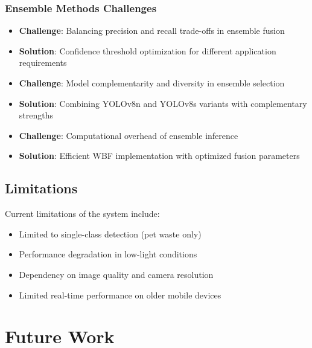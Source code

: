 \documentclass[12pt,a4paper]{article}
\begin{document}
\subsubsection{Ensemble Methods Challenges}
\begin{itemize}
    \item \textbf{Challenge}: Balancing precision and recall trade-offs in ensemble fusion
    \item \textbf{Solution}: Confidence threshold optimization for different application requirements
    \item \textbf{Challenge}: Model complementarity and diversity in ensemble selection
    \item \textbf{Solution}: Combining YOLOv8n and YOLOv8s variants with complementary strengths
    \item \textbf{Challenge}: Computational overhead of ensemble inference
    \item \textbf{Solution}: Efficient WBF implementation with optimized fusion parameters
\end{itemize}

\subsection{Limitations}

Current limitations of the system include:
\begin{itemize}
    \item Limited to single-class detection (pet waste only)
    \item Performance degradation in low-light conditions
    \item Dependency on image quality and camera resolution
    \item Limited real-time performance on older mobile devices
\end{itemize}

\section{Future Work}
\end{document}
